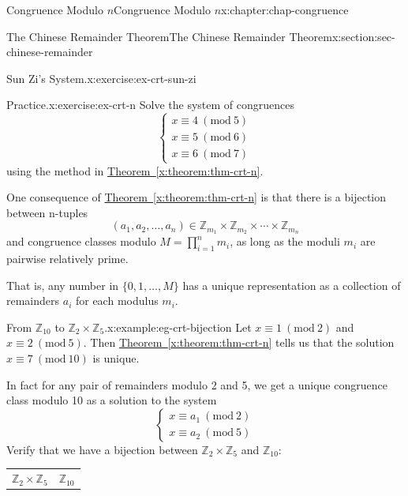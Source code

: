 \documentclass[oneside,10pt,]{book}
\newcommand{\tabularfont}{\relax}
\newcommand{\xreffont}{\relax}
\numberwithin{equation}{section}
\newcommand{\Mod}[1]{\ \left(\mathrm{mod}\ #1\right)}
\begin{document}
\begin{chapterptx}{Congruence Modulo \(n\)}{}{Congruence Modulo \(n\)}{}{}{x:chapter:chap-congruence}
\begin{sectionptx}{The Chinese Remainder Theorem}{}{The Chinese Remainder Theorem}{}{}{x:section:sec-chinese-remainder}
\begin{inlineexercise}{Sun Zi's System.}{x:exercise:ex-crt-sun-zi}
\end{inlineexercise}
\begin{inlineexercise}{Practice.}{x:exercise:ex-crt-n}%
Solve the system of congruences%
\begin{equation*}
\begin{cases} x \equiv 4 \Mod{5} \\ x \equiv 5 \Mod{6} \\ x \equiv 6 \Mod{7} \end{cases}
\end{equation*}
using the method in \hyperref[x:theorem:thm-crt-n]{Theorem~{\xreffont\ref{x:theorem:thm-crt-n}}}.%
\end{inlineexercise}
One consequence of \hyperref[x:theorem:thm-crt-n]{Theorem~{\xreffont\ref{x:theorem:thm-crt-n}}} is that there is a bijection between n-tuples%
\begin{equation*}
(a_1,a_2,\ldots,a_n) \in \mathbb{Z}_{m_1} \times \mathbb{Z}_{m_2} \times \cdots \times \mathbb{Z}_{m_n}
\end{equation*}
and congruence classes modulo \(M = \prod_{i=1}^n m_i\), as long as the moduli \(m_i\) are pairwise relatively prime.%
\par
That is, any number in \(\{0,1,\ldots,M\}\) has a unique representation as a collection of remainders \(a_i\) for each modulus \(m_i\).%
\begin{example}{From \(\mathbb{Z}_{10}\) to \(\mathbb{Z}_2 \times \mathbb{Z}_5\).}{x:example:eg-crt-bijection}%
Let \(x \equiv 1 \Mod{2}\) and \(x \equiv 2 \Mod{5}\). Then \hyperref[x:theorem:thm-crt-n]{Theorem~{\xreffont\ref{x:theorem:thm-crt-n}}} tells us that the solution \(x \equiv 7 \Mod{10}\) is unique.%
\par
In fact for any pair of remainders modulo 2 and 5, we get a unique congruence class modulo 10 as a solution to the system%
\begin{equation*}
\begin{cases} x \equiv a_1 \Mod{2} \\ x \equiv a_2 \Mod{5}\end{cases}
\end{equation*}
Verify that we have a bijection between \(\mathbb{Z}_2 \times \mathbb{Z}_5\) and \(\mathbb{Z}_{10}\):%
\begin{sidebyside}{2}{0.15}{0.15}{0.1}%
\begin{sbspanel}{0.3}%
{\centering%
{\tabularfont%
\begin{tabular}{ll}
\multicolumn{1}{c}{\(\mathbb{Z}_2 \times \mathbb{Z}_5\)}&\multicolumn{1}{c}{\(\mathbb{Z}_{10}\)}\tabularnewline[0pt]

\end{tabular}}}
\end{sbspanel}
\end{sidebyside}
\end{example}
\end{sectionptx}
\end{chapterptx}
\end{document}
